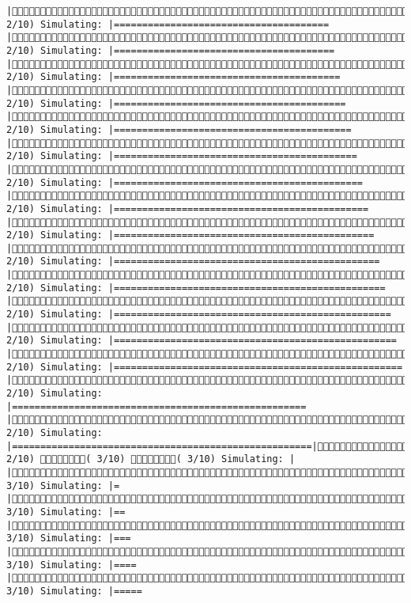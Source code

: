 \documentclass[]{article}
\begin{document}
\begin{verbatim}
|( 2/10) Simulating: |======================================               |( 2/10) Simulating: |=======================================              |( 2/10) Simulating: |========================================             |( 2/10) Simulating: |=========================================            |( 2/10) Simulating: |==========================================           |( 2/10) Simulating: |===========================================          |( 2/10) Simulating: |============================================         |( 2/10) Simulating: |=============================================        |( 2/10) Simulating: |==============================================       |( 2/10) Simulating: |===============================================      |( 2/10) Simulating: |================================================     |( 2/10) Simulating: |=================================================    |( 2/10) Simulating: |==================================================   |( 2/10) Simulating: |===================================================  |( 2/10) Simulating: |==================================================== |( 2/10) Simulating: |=====================================================|( 2/10) ( 3/10) ( 3/10) Simulating: |                                                     |( 3/10) Simulating: |=                                                    |( 3/10) Simulating: |==                                                   |( 3/10) Simulating: |===                                                  |( 3/10) Simulating: |====                                                 |( 3/10) Simulating: |=====                                   
\end{verbatim}
\end{document}
